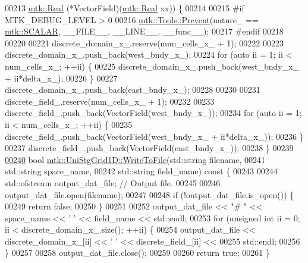 \begin{DoxyCode}
00213     \hyperlink{group__c01-roots_gac080bbbf5cbb5502c9f00405f894857d}{mtk::Real} (*VectorField)(\hyperlink{group__c01-roots_gac080bbbf5cbb5502c9f00405f894857d}{mtk::Real} xx)) \{
00214 
00215 \textcolor{preprocessor}{  #if MTK\_DEBUG\_LEVEL > 0}
00216   \hyperlink{classmtk_1_1Tools_a332324c6f25e66be9dff48c5987a3b9f}{mtk::Tools::Prevent}(nature\_ == \hyperlink{namespacemtk_ga4c54f2a329cfb4e56213b02a259d19e2af481d45bd70d41381c7d72e200889205}{mtk::SCALAR}, \_\_FILE\_\_, \_\_LINE\_\_, \_\_func\_\_);
00217 \textcolor{preprocessor}{  #endif}
00218 
00220 
00221   discrete\_domain\_x\_.reserve(num\_cells\_x\_ + 1);
00222 
00223   discrete\_domain\_x\_.push\_back(west\_bndy\_x\_);
00224   \textcolor{keywordflow}{for} (\textcolor{keyword}{auto} ii = 1; ii < num\_cells\_x\_; ++ii) \{
00225     discrete\_domain\_x\_.push\_back(west\_bndy\_x\_ + ii*delta\_x\_);
00226   \}
00227   discrete\_domain\_x\_.push\_back(east\_bndy\_x\_);
00228 
00230 
00231   discrete\_field\_.reserve(num\_cells\_x\_ + 1);
00232 
00233   discrete\_field\_.push\_back(VectorField(west\_bndy\_x\_));
00234   \textcolor{keywordflow}{for} (\textcolor{keyword}{auto} ii = 1; ii < num\_cells\_x\_; ++ii) \{
00235     discrete\_field\_.push\_back(VectorField(west\_bndy\_x\_ + ii*delta\_x\_));
00236   \}
00237   discrete\_field\_.push\_back(VectorField(east\_bndy\_x\_));
00238 \}
00239 
\hypertarget{mtk__uni__stg__grid__1d_8cc_source_l00240}{}\hyperlink{classmtk_1_1UniStgGrid1D_a6d2c10aa9468a037829f0eb043b898dc}{00240} \textcolor{keywordtype}{bool} \hyperlink{classmtk_1_1UniStgGrid1D_a6d2c10aa9468a037829f0eb043b898dc}{mtk::UniStgGrid1D::WriteToFile}(std::string filename,
00241                                     std::string space\_name,
00242                                     std::string field\_name)\textcolor{keyword}{ const }\{
00243 
00244   std::ofstream output\_dat\_file;  \textcolor{comment}{// Output file.}
00245 
00246   output\_dat\_file.open(filename);
00247 
00248   \textcolor{keywordflow}{if} (!output\_dat\_file.is\_open()) \{
00249     \textcolor{keywordflow}{return} \textcolor{keyword}{false};
00250   \}
00251 
00252   output\_dat\_file << \textcolor{stringliteral}{"# "} << space\_name <<  \textcolor{charliteral}{' '} << field\_name << std::endl;
00253   \textcolor{keywordflow}{for} (\textcolor{keywordtype}{unsigned} \textcolor{keywordtype}{int} ii = 0; ii < discrete\_domain\_x\_.size(); ++ii) \{
00254     output\_dat\_file << discrete\_domain\_x\_[ii] << \textcolor{charliteral}{' '} << discrete\_field\_[ii] <<
00255       std::endl;
00256   \}
00257 
00258   output\_dat\_file.close();
00259 
00260   \textcolor{keywordflow}{return} \textcolor{keyword}{true};
00261 \}
\end{DoxyCode}
